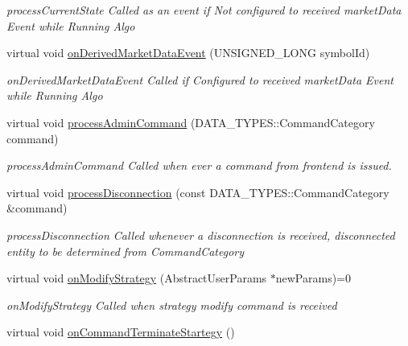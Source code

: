 \begin{DoxyCompactItemize}
\begin{DoxyCompactList}\small\item\em process\-Current\-State Called as an event if Not configured to received market\-Data Event while Running Algo \end{DoxyCompactList}\item 
virtual void \hyperlink{class_a_p_i2_1_1_s_g_context_a03606cff5f8b0488e6a14fd937df47a9}{on\-Derived\-Market\-Data\-Event} (U\-N\-S\-I\-G\-N\-E\-D\-\_\-\-L\-O\-N\-G symbol\-Id)
\begin{DoxyCompactList}\small\item\em on\-Derived\-Market\-Data\-Event Called if Configured to received market\-Data Event while Running Algo \end{DoxyCompactList}\item 
virtual void \hyperlink{class_a_p_i2_1_1_s_g_context_a97093f90d86c4d3f8ca00fc6a7c593b6}{process\-Admin\-Command} (D\-A\-T\-A\-\_\-\-T\-Y\-P\-E\-S\-::\-Command\-Category command)
\begin{DoxyCompactList}\small\item\em process\-Admin\-Command Called when ever a command from frontend is issued. \end{DoxyCompactList}\item 
virtual void \hyperlink{class_a_p_i2_1_1_s_g_context_a3e87d0c000fd0770a13ce27d6ff662d4}{process\-Disconnection} (const D\-A\-T\-A\-\_\-\-T\-Y\-P\-E\-S\-::\-Command\-Category \&command)
\begin{DoxyCompactList}\small\item\em process\-Disconnection Called whenever a disconnection is received, disconnected entity to be determined from Command\-Category \end{DoxyCompactList}\item 
\hypertarget{class_a_p_i2_1_1_s_g_context_afcf2afb6a7ee4528832a529e20b57f5d}{virtual void \hyperlink{class_a_p_i2_1_1_s_g_context_afcf2afb6a7ee4528832a529e20b57f5d}{on\-Modify\-Strategy} (Abstract\-User\-Params $\ast$new\-Params)=0}\label{class_a_p_i2_1_1_s_g_context_afcf2afb6a7ee4528832a529e20b57f5d}

\begin{DoxyCompactList}\small\item\em on\-Modify\-Strategy Called when strategy modify command is received \end{DoxyCompactList}\item 
\hypertarget{class_a_p_i2_1_1_s_g_context_a85d7ac789482c407911a66055690a76c}{virtual void \hyperlink{class_a_p_i2_1_1_s_g_context_a85d7ac789482c407911a66055690a76c}{on\-Command\-Terminate\-Startegy} ()}\label{class_a_p_i2_1_1_s_g_context_a85d7ac789482c407911a66055690a76c}


\end{DoxyCompactItemize}
